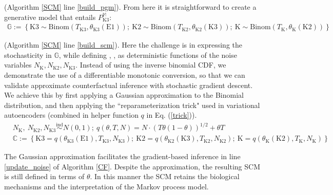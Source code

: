 \documentclass{article}
\def\eqref#1{Eq. (\ref{#1})}
\begin{document}
\vspace{-2mm}
 (Algorithm \ref{SCM} line \ref{build_pgm}).
From here it is straightforward to create a generative model that entails $P_{\text{K3}}^{\mathbb{M}}$:
\begin{eqnarray}
\mathbb{G}:= \left\{
\text{K3} \sim \text{Binom}(T_{\text{K3}}, \theta_{\text{K3}}(\text{E1})); \ 
\text{K2} \sim \text{Binom}(T_{\text{K2}}, \theta_{\text{K2}}(\text{K3})); \ 
\text{K} \sim \text{Binom}(T_{\text{K}}, \theta_{\text{K}}(\text{K2}))
\right\} \label{gen_model}
\end{eqnarray}

\vspace{-2mm}
 (Algorithm \ref{SCM} line \ref{build_scm}). Here the challenge is in expressing the stochasticity in $\mathbb{G}$, while defining , ,  as deterministic functions of the noise variables $N_{\text{K}}, N_{\text{K2}}, N_{\text{K3}}$. Instead of using the inverse binomial CDF, we demonstrate the use of a differentiable monotonic conversion, so that we can validate approximate counterfactual inference with stochastic gradient descent.  We achieve this by first applying a Gaussian approximation to the Binomial distribution, and then applying the ``reparameterization trick" used in variational autoencoders \cite{rezende2014stochastic} (combined in helper function $q$ in \eqref{trick}).  %
\vspace{-2mm}
\begin{eqnarray}
& N_{\text{K}}, \ N_{\text{K2}}, N_{\text{K3}} \overset{\text{ind}}{\sim} N(0, 1);\  q(\theta, T, N) = N \cdot (T \theta (1 - \theta))^{1/2} + \theta T & \label{trick}\\
& \mathbb{C}:= \left\{
\text{K3} = q(\theta_{\text{K3}}(\text{E1}), T_{\text{K3}}, N_{\text{K3}});\ 
\text{K2} =  q(\theta_{\text{K2}}(\text{K3}), T_{\text{K2}}, N_{\text{K2}});\ 
\text{K} = q(\theta_{\text{K}}(\text{K2}), T_{\text{K}}, N_{\text{K}}) \right\}~~~
 & \label{scm_model}
\end{eqnarray}

The Gaussian approximation facilitates the gradient-based inference in line \ref{update_noise} of Algorithm \ref{CF}.  Despite the approximation, the resulting SCM is still defined in terms of $\theta$. In this manner the SCM retains the biological mechanisms and the interpretation of the Markov process model.
\end{document}
